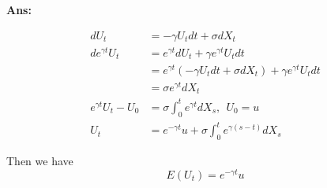 \documentclass[11pt, notitlepage]{article}
\def\\ln{\mathrm{\ln}}
\def\\exp{\mathrm{\exp}}
\def\\max{\mathrm{\max}}
\begin{document}
\vspace{5mm}
\color{black}
\textbf {Ans:}

\begin{equation*}
\begin{aligned}
dU_t &= -\gamma U_t dt + \sigma dX_t \\ 
d e^{\gamma t}U_t & = e^{\gamma t}dU_t + \gamma e^{\gamma t} U_t dt\\
& = e^{\gamma t}(-\gamma U_t dt + \sigma dX_t) + \gamma e^{\gamma t} U_t dt\\
&= \sigma e^{\gamma t} dX_t\\
e^{\gamma t} U_t - U_0 &= \sigma \int^t_0 e^{\gamma t} dX_s, ~~ U_0 = u\\
U_t & = e^{-\gamma t} u + \sigma \int^t_0 e^{\gamma (s-t)} dX_s
\end{aligned}
\end{equation*}

Then we have
$$ E(U_t) = e^{-\gamma t}u$$
\fi
\end{document}
